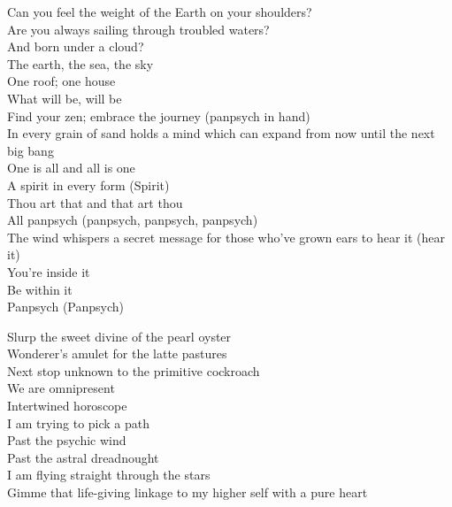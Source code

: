 


Can you feel the weight of the Earth on your shoulders?\\
Are you always sailing through troubled waters?\\
And born under a cloud?\\
The earth, the sea, the sky\\
One roof; one house\\

What will be, will be\\
Find your zen; embrace the journey (panpsych in hand)\\
In every grain of sand holds a mind which can expand from now until the next big bang\\

One is all and all is one\\
A spirit in every form (Spirit)\\
Thou art that and that art thou\\
All panpsych (panpsych, panpsych, panpsych)\\
The wind whispers a secret message for those who've grown ears to hear it (hear it)\\
You're inside it\\
Be within it\\
Panpsych (Panpsych)\\


Slurp the sweet divine of the pearl oyster\\
Wonderer's amulet for the latte pastures\\
Next stop unknown to the primitive cockroach\\
We are omnipresent\\
Intertwined horoscope\\

I am trying to pick a path\\
Past the psychic wind\\
Past the astral dreadnought\\
I am flying straight through the stars\\
Gimme that life-giving linkage to my higher self with a pure heart\\


